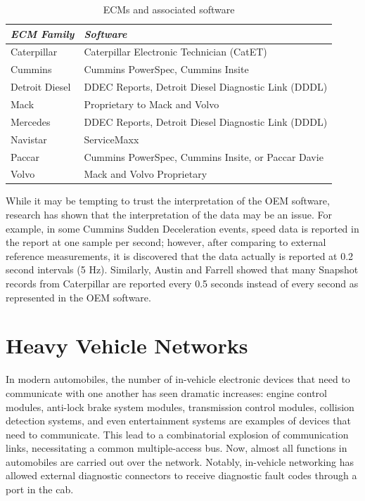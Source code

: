 \begin{table}
\centering
\begin{tabular}{|l|l|}
\hline
\emph{ECM Family} & \emph{Software}\\
\hline
Caterpillar & Caterpillar Electronic Technician (CatET)\\
\hline
Cummins & Cummins PowerSpec, Cummins Insite\\
\hline
Detroit Diesel & DDEC Reports, Detroit Diesel Diagnostic Link (DDDL)\\
\hline
Mack & Proprietary to Mack and Volvo\\
\hline
Mercedes & DDEC Reports, Detroit Diesel Diagnostic Link (DDDL)\\
\hline
Navistar & ServiceMaxx \\
\hline
Paccar & Cummins PowerSpec, Cummins Insite, or Paccar Davie\\
\hline
Volvo & Mack and Volvo Proprietary\\
\hline
\end{tabular}
\caption{ECMs and associated software}
\label{tab:software}
\end{table}
While it may be tempting to trust the interpretation of the OEM software, research has shown 
that the interpretation of the data may be an issue. For example, in some Cummins Sudden Deceleration 
events, speed data is reported in the report at one sample per second; however, after comparing to 
external reference measurements, it is discovered that the data actually is reported at 0.2 second 
intervals (5 Hz)\cite{bortolin2009}. Similarly, Austin and Farrell \cite{austin2011} showed that many Snapshot records 
from Caterpillar are reported every 0.5 seconds instead of every second as represented in the OEM software.

\section{Heavy Vehicle Networks}

In modern automobiles, the number of in-vehicle electronic devices that need to communicate with one another has seen dramatic increases:
engine control modules, anti-lock brake system modules, transmission control modules, collision detection systems, and even entertainment systems are examples of
devices that need to communicate. This lead to a combinatorial explosion of communication links, necessitating a common multiple-access
bus. Now, almost all functions in automobiles are carried out over the network. Notably, in-vehicle networking has allowed external diagnostic
connectors to receive diagnostic fault codes through a port in the cab.

